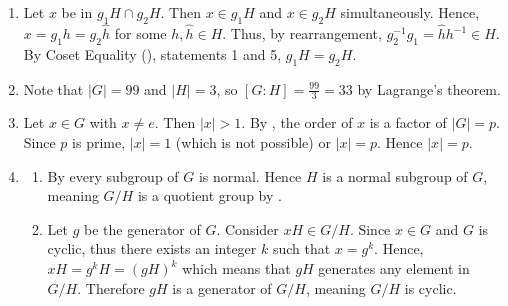 \begin{enumerate}
    \item Let $x$ be in $g_1H \cap g_2H$. Then $x \in g_1H$ and $x \in g_2H$ simultaneously. Hence, $x = g_1h = g_2\hat{h}$ for some $h, \hat{h} \in H$. Thus, by rearrangement, $g_2^{-1}g_1 = \hat{h}h^{-1} \in H$. By Coset Equality (), statements 1 and 5, $g_1H = g_2H$.

    \item Note that $|G| = 99$ and $|H| = 3$, so $[G:H] = \frac{99}{3} = 33$ by Lagrange's theorem.

    \item Let $x \in G$ with $x \neq e$. Then $|x| > 1$. By , the order of $x$ is a factor of $|G| = p$. Since $p$ is prime, $|x| = 1$ (which is not possible) or $|x| = p$. Hence $|x| = p$.
    
    \item \begin{enumerate}[label=(\roman*)]
        \item By  every subgroup of $G$ is normal. Hence $H$ is a normal subgroup of $G$, meaning $G/H$ is a quotient group by .
        \item Let $g$ be the generator of $G$. Consider $xH \in G/H$. Since $x \in G$ and $G$ is cyclic, thus there exists an integer $k$ such that $x = g^k$. Hence, $xH = g^kH = (gH)^k$ which means that $gH$ generates any element in $G/H$. Therefore $gH$ is a generator of $G/H$, meaning $G/H$ is cyclic.
    \end{enumerate}
\end{enumerate}

